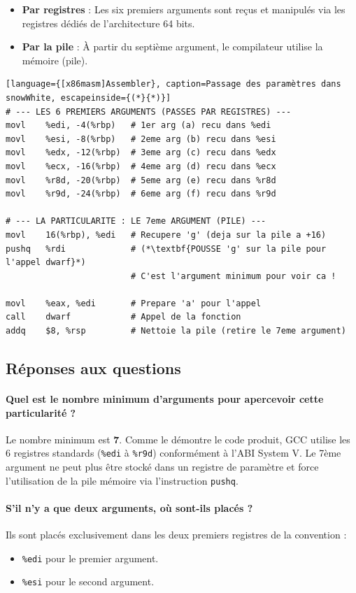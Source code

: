 \begin{itemize}
    \item \textbf{Par registres} : Les six premiers arguments sont reçus et manipulés via les registres dédiés de l'architecture 64 bits.
    \item \textbf{Par la pile} : À partir du septième argument, le compilateur utilise la mémoire (pile).
\end{itemize}

\begin{lstlisting}[language={[x86masm]Assembler}, caption=Passage des paramètres dans snowWhite, escapeinside={(*}{*)}]
# --- LES 6 PREMIERS ARGUMENTS (PASSES PAR REGISTRES) ---
movl    %edi, -4(%rbp)   # 1er arg (a) recu dans %edi
movl    %esi, -8(%rbp)   # 2eme arg (b) recu dans %esi
movl    %edx, -12(%rbp)  # 3eme arg (c) recu dans %edx
movl    %ecx, -16(%rbp)  # 4eme arg (d) recu dans %ecx
movl    %r8d, -20(%rbp)  # 5eme arg (e) recu dans %r8d
movl    %r9d, -24(%rbp)  # 6eme arg (f) recu dans %r9d

# --- LA PARTICULARITE : LE 7eme ARGUMENT (PILE) ---
movl    16(%rbp), %edi   # Recupere 'g' (deja sur la pile a +16)
pushq   %rdi             # (*\textbf{POUSSE 'g' sur la pile pour l'appel dwarf}*)
                         # C'est l'argument minimum pour voir ca !

movl    %eax, %edi       # Prepare 'a' pour l'appel
call    dwarf            # Appel de la fonction
addq    $8, %rsp         # Nettoie la pile (retire le 7eme argument)
\end{lstlisting}

\subsection{Réponses aux questions}

\paragraph{Quel est le nombre minimum d’arguments pour apercevoir cette particularité ?}
Le nombre minimum est \textbf{7}. Comme le démontre le code produit, GCC utilise les 6 registres standards (\texttt{\%edi} à \texttt{\%r9d}) conformément à l'ABI System V. Le 7ème argument ne peut plus être stocké dans un registre de paramètre et force l'utilisation de la pile mémoire via l'instruction \texttt{pushq}.

\paragraph{S’il n’y a que deux arguments, où sont-ils placés ?}
Ils sont placés exclusivement dans les deux premiers registres de la convention :
\begin{itemize}
    \item \texttt{\%edi} pour le premier argument.
    \item \texttt{\%esi} pour le second argument.
\end{itemize}

